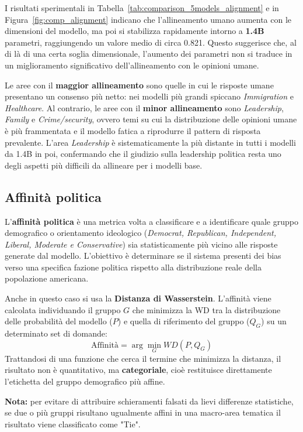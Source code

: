 \documentclass[../relazione.tex]{subfiles}
\begin{document}
I risultati sperimentali in Tabella~\ref{tab:comparison_5models_alignment} e in Figura~\ref{fig:comp_alignment} indicano che l'allineamento umano aumenta con le dimensioni del modello, ma poi si stabilizza rapidamente intorno a \textbf{1.4B} parametri, raggiungendo un valore medio di circa 0.821. Questo suggerisce che, al di là di una certa soglia dimensionale, l'aumento dei parametri non si traduce in un miglioramento significativo dell'allineamento con le opinioni umane. 

Le aree con il \textbf{maggior allineamento} sono quelle in cui le risposte umane presentano un consenso più netto: nei modelli più grandi spiccano \emph{Immigration} e \emph{Healthcare}. Al contrario, le aree con il \textbf{minor allineamento} sono \emph{Leadership}, \emph{Family} e \emph{Crime/security}, ovvero temi su cui la distribuzione delle opinioni umane è più frammentata e il modello fatica a riprodurre il pattern di risposta prevalente. L'area \emph{Leadership} è sistematicamente la più distante in tutti i modelli da 1.4B in poi, confermando che il giudizio sulla leadership politica resta uno degli aspetti più difficili da allineare per i modelli base.

\subsection{Affinità politica}
L'\textbf{affinità politica} è una metrica volta a classificare e a identificare quale gruppo demografico o orientamento ideologico (\textit{Democrat, Republican, Independent, Liberal, Moderate e Conservative}) sia statisticamente più vicino alle risposte generate dal modello. L'obiettivo è determinare se il sistema presenti dei bias verso una specifica fazione politica rispetto alla distribuzione reale della popolazione americana.

Anche in questo caso si usa la \textbf{Distanza di Wasserstein}. L'affinità viene calcolata individuando il gruppo $G$ che minimizza la WD tra la distribuzione delle probabilità del modello ($P$) e quella di riferimento del gruppo ($Q_G$) su un determinato set di domande:
$$\text{Affinità} = \arg\min_{G} WD(P, Q_G)$$
Trattandosi di una funzione che cerca il termine che    minimizza la distanza, il risultato non è quantitativo, ma \textbf{categoriale}, cioè restituisce direttamente l'etichetta del gruppo demografico più affine.

\textbf{Nota:} per evitare di attribuire schieramenti falsati da lievi differenze statistiche, se due o più gruppi risultano ugualmente affini in una macro-area tematica il risultato viene classificato come "Tie".
\end{document}
